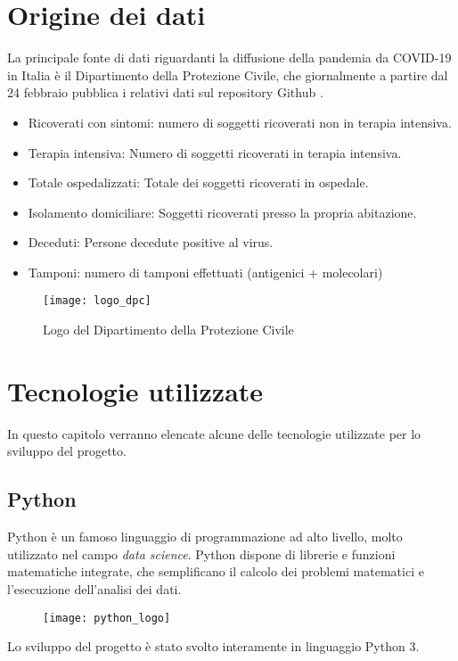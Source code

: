 
\section{Origine dei dati}
La principale fonte di dati riguardanti la diffusione della pandemia da COVID-19 in Italia è il Dipartimento della Protezione Civile, che giornalmente a partire dal 24 febbraio pubblica i relativi dati sul repository Github \cite{repository}.

\begin{itemize}
    \item Ricoverati con sintomi: numero di soggetti ricoverati non in terapia intensiva.
    \item Terapia intensiva: Numero di soggetti ricoverati in terapia intensiva.
    \item Totale ospedalizzati: Totale dei soggetti ricoverati in ospedale.
    \item Isolamento domiciliare: Soggetti ricoverati presso la propria abitazione.
    \item Deceduti: Persone decedute positive al virus.
    \item Tamponi: numero di tamponi effettuati (antigenici + molecolari)
\end{itemize}


\begin{figure}[htp]
    \centering
    \texttt{[image: logo\_dpc]}
    \caption{Logo del Dipartimento della Protezione Civile}
\end{figure}


\section{Tecnologie utilizzate}

In questo capitolo verranno elencate alcune delle tecnologie utilizzate per lo sviluppo del progetto.

\subsection{Python}
Python è un famoso linguaggio di programmazione ad alto livello, molto utilizzato nel campo \emph{data science}.
Python dispone di librerie e funzioni matematiche integrate, che semplificano il calcolo dei problemi matematici e l'esecuzione dell'analisi dei dati.
\begin{figure}[htp]
    \centering
    \texttt{[image: python\_logo]}
\end{figure}
Lo sviluppo del progetto è stato svolto interamente in linguaggio Python 3.

